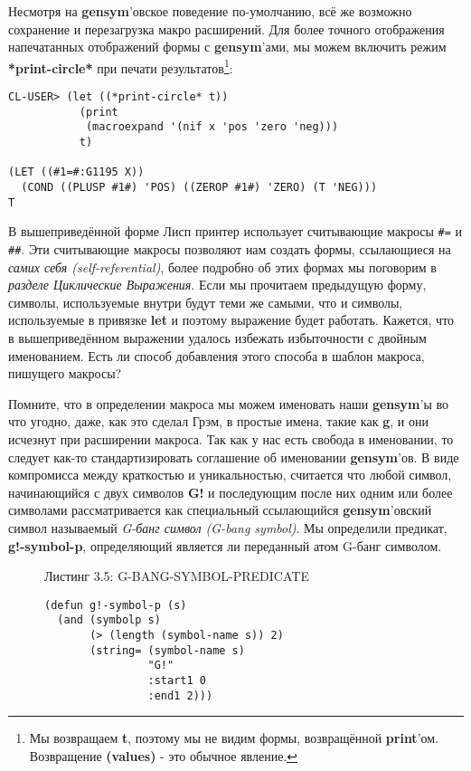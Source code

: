 Несмотря на \textbf{gensym}'овское поведение по-умолчанию, всё же возможно сохранение и перезагрузка макро расширений. Для более точного отображения напечатанных отображений формы с \textbf{gensym}'ами, мы можем включить режим \textbf{*print-circle*} при печати результатов\footnote{Мы возвращаем \textbf{t}, поэтому мы не видим формы, возвращённой \textbf{print}'ом. Возвращение \textbf{(values)} - это обычное явление.}:

\begin{verbatim}
CL-USER> (let ((*print-circle* t))
           (print
            (macroexpand '(nif x 'pos 'zero 'neg)))
           t)

(LET ((#1=#:G1195 X))
  (COND ((PLUSP #1#) 'POS) ((ZEROP #1#) 'ZERO) (T 'NEG))) 
T
\end{verbatim}

В вышеприведённой форме Лисп принтер использует считывающие макросы \verb"#=" и \verb"##". Эти считывающие макросы позволяют нам создать формы, ссылающиеся на \emph{самих себя (self-referential)}, более подробно об этих формах мы поговорим в \emph{разделе Циклические Выражения}. Если мы прочитаем предыдущую форму, символы, используемые внутри будут теми же самыми, что и символы, используемые в привязке \textbf{let} и поэтому выражение будет работать. Кажется, что в вышеприведённом выражении удалось избежать избыточности с двойным именованием. Есть ли способ добавления этого способа в шаблон макроса, пишущего макросы?

Помните, что в определении макроса мы можем именовать наши \textbf{gensym}'ы во что угодно, даже, как это сделал Грэм, в простые имена, такие как \textbf{g}, и они исчезнут при расширении макроса. Так как у нас есть свобода в именовании, то следует как-то стандартизировать соглашение об именовании \textbf{gensym}'ов. В виде компромисса между краткостью и уникальностью, считается что любой символ, начинающийся с двух символов \textbf{G!} и последующим после них одним или более символами рассматривается как специальный ссылающийся \textbf{gensym}'овский символ называемый \emph{G-банг символ (G-bang symbol)}. Мы определили предикат, \textbf{g!-symbol-p}, определяющий является ли переданный атом G-банг символом.

\begin{figure}Листинг 3.5: G-BANG-SYMBOL-PREDICATE\label{listing_3.5}
\listbegin
\begin{verbatim}
(defun g!-symbol-p (s)
  (and (symbolp s)
       (> (length (symbol-name s)) 2)
       (string= (symbol-name s)
                "G!"
                :start1 0
                :end1 2)))
\end{verbatim}
\listend
\end{figure}

